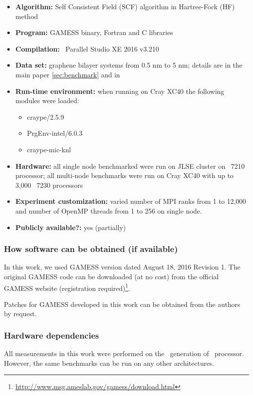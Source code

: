 {\small
\begin{itemize}
  \item {\bf Algorithm: } Self Consistent Field (SCF) algorithm in Hartree-Fock (HF) method
  \item {\bf Program: } GAMESS binary, Fortran and C libraries
  \item {\bf Compilation: } \intelreg\ Parallel Studio XE 2016 v3.210
  \item {\bf Data set: } graphene bilayer systems from 0.5 nm to 5 nm; details are in the
  		main paper \cref{sec:benchmark} and in 
  \item {\bf Run-time environment: } when running on Cray XC40 the following modules were loaded:
  		\begin{itemize}
        	\item craype/2.5.9
            \item PrgEnv-intel/6.0.3
            \item craype-mic-knl  
        \end{itemize}
  \item {\bf Hardware: } all single node benchmarked were run on JLSE cluster on \intelphireg\ 7210 processor; all multi-node benchmarks were run on Cray XC40 with up to 3,000 \intelphireg\ 7230 processors
  \item {\bf Experiment customization: } varied number of MPI ranks from 1 to 12,000 and number of OpenMP threads from 1 to 256 on single node.
  \item {\bf Publicly available?: } yes (partially)
\end{itemize}
}

\subsubsection{How software can be obtained (if available)}

In this work, we used GAMESS version dated August 18, 2016 Revision 1. The original GAMESS code can be downloaded (at no cost) from the official GAMESS website (registration required)\footnote{\url{http://www.msg.ameslab.gov/gamess/download.html}}.

Patches for GAMESS developed in this work can be obtained from the authors by request.


\subsubsection{Hardware dependencies}
All measurements in this work were performed on the \second\ generation of \intelphireg\ processor. However, the same benchmarks can be run on any other architectures.

